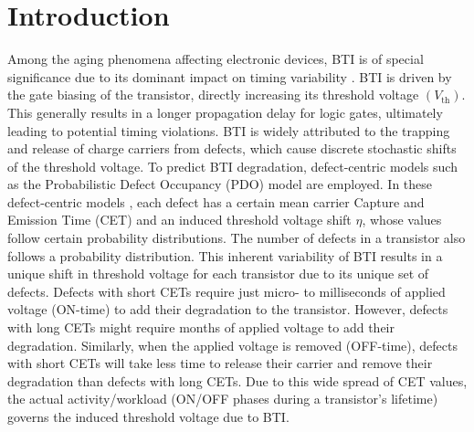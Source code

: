 \section{Introduction}
Among the aging phenomena affecting electronic devices, \gls{BTI} is of special significance due to its dominant impact on timing variability \cite{duchAnalysisFunctionalErrors2020, santana-andreoImpactBTIHCI2022, moritaEfficientAnalysisMitigation2022, klemmeEfficientLearningStrategies2022}. \gls{BTI} is driven by the gate biasing of the transistor, directly increasing its threshold voltage $(V_\text{th})$. This generally results in a longer propagation delay for logic gates, ultimately leading to potential timing violations. \gls{BTI} is widely attributed to the trapping and release of charge carriers from defects, which cause discrete stochastic shifts of the threshold voltage. To predict \gls{BTI} degradation, defect-centric models such as the Probabilistic Defect Occupancy (PDO) model \cite{martin-martinezProbabilisticDefectOccupancy2011} are employed. In these defect-centric models \cite{grasserParadigmShiftUnderstanding2011, reisingerUnderstandingModelingAC2011, kaczerDefectcentricPerspectiveDevice2015}, each defect has a certain mean carrier Capture and Emission Time (CET) and an induced threshold voltage shift $\eta$, whose values follow certain probability distributions. The number of defects in a transistor also follows a probability distribution. This inherent variability of \gls{BTI} results in a unique shift in threshold voltage for each transistor due to its unique set of defects. Defects with short CETs require just micro- to milliseconds of applied voltage (ON-time) to add their degradation to the transistor. However, defects with long CETs might require months of applied voltage to add their degradation. Similarly, when the applied voltage is removed (OFF-time), defects with short CETs will take less time to release their carrier and remove their degradation than defects with long CETs. Due to this wide spread of CET values, the actual activity/workload (ON/OFF phases during a transistor's lifetime) governs the induced threshold voltage due to BTI. 

